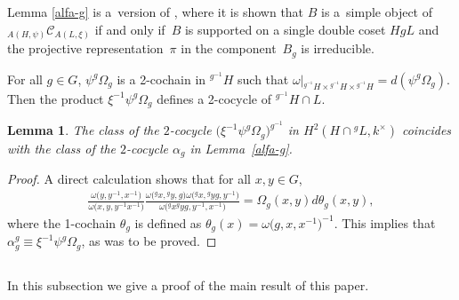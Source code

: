 \documentclass[pdftex]{sigma}
\numberwithin{equation}{section}
\newtheorem{Lemma}[Theorem]{Lemma}
 { \theoremstyle{definition}
\newtheorem{Example}[Theorem]{Example}
\newtheorem{Remark}[Theorem]{Remark} }
\newcommand{\cch}{\Omega}
\newcommand{\C}{{\mathcal C}}
\newcommand{\1}{\textbf{1}}
\begin{document}
\begin{Remark}\label{rmk-alfag} Lemma \ref{alfa-g} is a~version of \cite[Proposition~3.2]{ostrik}, where it is shown that $B$ is a~simple object of~$_{A(H, \psi)}\C_{A(L, \xi)}$ if and only if~$B$ is supported on a single double coset $HgL$ and the projective representation~$\pi$ in the component~$B_g$ is irreducible.
\end{Remark}

For all $g \in G$, $\psi^g \cch_g$ is a 2-cochain in $^{g^{-1}\!}\!H$ such that $\omega\vert_{{}^{g^{-1}}H \times {}^{g^{-1}}H \times {}^{g^{-1}} H} = d(\psi^g \cch_g)$. Then the product $\xi^{-1} \psi^g \cch_g$ def\/ines a 2-cocycle of ${}^{g^{-1}} H \cap L$.

\begin{Lemma}\label{rel-cociclos} The class of the $2$-cocycle $\big(\xi^{-1} \psi^g \cch_g\big)^{g^{-1}}$ in $H^2(H\cap {}^gL, k^\times)$ coincides with the class of the $2$-cocycle $\alpha_g$ in Lemma~{\rm \ref{alfa-g}}.
\end{Lemma}

\begin{proof}
A direct calculation shows that for all $x, y \in G$,
\begin{gather*}\frac{\omega\big(y, y^{-1}, x^{-1}\big)}
{\omega\big(x, y, y^{-1}x^{-1}\big)}
\frac{\omega\big({}^gx, {}^gy, g\big) \omega\big({}^gx, {}^gyg, {} y^{-1}\big)}
{\omega\big({}^gx ^gyg, {}y^{-1}, x^{-1}\big)}
= \cch_g(x, y) d\theta_g (x, y),\end{gather*}
where the 1-cochain $\theta_g$ is def\/ined as $\theta_g(x) = \omega\big(g, x, x^{-1}\big)^{-1}$. This implies that $\alpha_g^g \equiv \xi^{-1} \psi^g \cch_g$, as was to be proved.
\end{proof}

\subsection{}\label{demo} In this subsection we give a proof of the main result of this paper.
\end{document}
